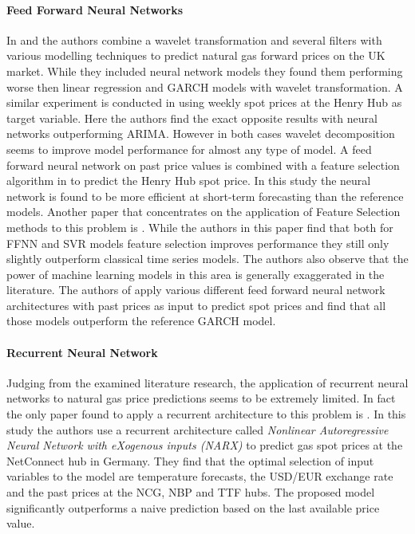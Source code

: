 \paragraph{Feed Forward Neural Networks}
In \cite{nguyen_combining_2008} and \cite{nguyen_short-term_2010} the authors combine a wavelet transformation and several filters with various modelling techniques to predict natural gas forward prices on the UK market. While they included neural network models they found them performing worse then linear regression and GARCH models with wavelet transformation. A similar experiment is conducted in \cite{jin_forecasting_2015} using weekly spot prices at the Henry Hub as target variable. Here the authors find the exact opposite results with neural networks outperforming ARIMA. However in both cases wavelet decomposition seems to improve model performance for almost any type of model. A feed forward neural network on past price values is combined with a feature selection algorithm in  \cite{salehnia_forecasting_2013} to predict the Henry Hub spot price. In this study the neural network is found to be more efficient at short-term forecasting than the reference models. Another paper that concentrates on the application of Feature Selection methods to this problem is \cite{ceperic_short-term_2017}. While the authors in this paper find that both for FFNN and SVR models feature selection improves performance they still only slightly outperform classical time series models. The authors also observe that the power of machine learning models in this area is generally exaggerated in the literature.
The authors of \cite{panella_forecasting_2012} apply various different feed forward neural network architectures with past prices as input to predict spot prices and find that all those models outperform the reference GARCH model.  

\paragraph{Recurrent Neural Network}
Judging from the examined literature research, the application of recurrent neural networks to natural gas price predictions seems to be extremely limited.
In fact the only paper found to apply a recurrent architecture to this problem is \cite{busse_forecasting_2012}. In this study the authors use a recurrent architecture called \textit{Nonlinear Autoregressive Neural Network with eXogenous inputs (NARX)} to predict gas spot prices at the NetConnect hub in Germany. They find that the optimal selection of input variables to the model are temperature forecasts, the USD/EUR exchange rate and the past prices at the NCG, NBP and TTF hubs. The proposed model significantly outperforms a naive prediction based on the last available price value. 

